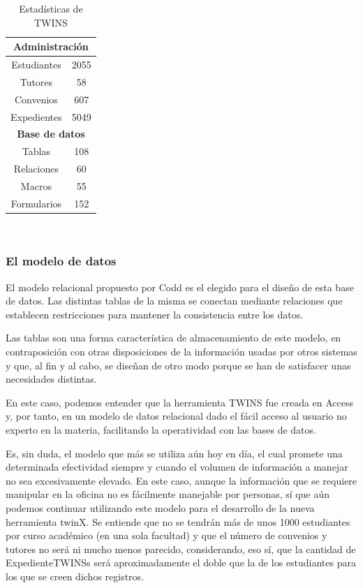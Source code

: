 \begin{table}[h]
	\begin{center}
		\begin{tabular}{ | c | c | } 
			\hline
			\multicolumn{2}{|c|}{\textbf{Administración}} \\
			\hline
			Estudiantes \footnotemark & 2055 \\ 
			\hline
			Tutores & 58 \\
			\hline
			Convenios  & 607 \\ 
			\hline
			Expedientes & 5049 \\ 
			\hline
			\multicolumn{2}{|c|}{\textbf{Base de datos}} \\
			\hline
			Tablas & 108 \\
			\hline
			Relaciones & 60 \\
			\hline
			Macros & 55 \\
			\hline
			Formularios & 152 \\
			\hline
		\end{tabular}
		\caption{Estadísticas de TWINS}
		\label{tab:estadisticasTWINS}
	\end{center}
\end{table}~



\subsubsection{El modelo de datos}

El modelo relacional propuesto por Codd es el elegido para el diseño de esta base de datos. Las distintas tablas de la misma se conectan mediante relaciones que establecen restricciones para mantener la consistencia entre los datos.

Las tablas son una forma característica de almacenamiento de este modelo, en contraposición con otras disposiciones de la información usadas por otros sistemas y que, al fin y al cabo, se diseñan de otro modo porque se han de satisfacer unas necesidades distintas.

En este caso, podemos entender que la herramienta TWINS fue creada en Access y, por tanto, en un modelo de datos relacional dado el fácil acceso al usuario no experto en la materia, facilitando la operatividad con las bases de datos.

Es, sin duda, el modelo que más se utiliza aún hoy en día, el cual promete una determinada efectividad siempre y cuando el volumen de información a manejar no sea excesivamente elevado. En este caso, aunque la información que se requiere manipular en la oficina no es fácilmente manejable por personas, sí que aún podemos continuar utilizando este modelo para el desarrollo de la nueva herramienta twinX. Se entiende que no se tendrán más de unos 1000 estudiantes por curso académico (en una sola facultad) y que el número de convenios y tutores no será ni mucho menos parecido, considerando, eso sí, que la cantidad de \glspl{ExpedienteTWINS} será aproximadamente el doble que la de los estudiantes para los que se creen dichos registros.


